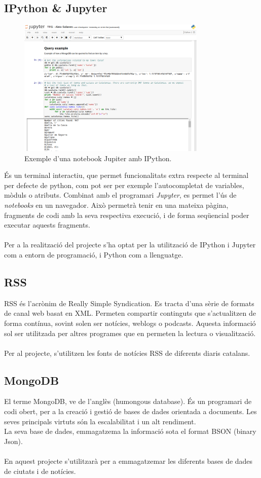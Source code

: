 \documentclass[12pt,a4paper,openright,oneside]{article}
\numberwithin{equation}{section}
\theoremstyle{definition}
\begin{document}
\subsection*{IPython \& Jupyter}
\begin{figure}[htbp]
\centering
\includegraphics[width=9cm]{ipython.png}
\caption{Exemple d'una notebook Jupiter amb IPython.}
\end{figure}
És un terminal interactiu, que permet funcionalitats extra respecte al terminal per defecte de python, com pot ser per exemple l'autocompletat de variables, mòduls o atributs. Combinat amb el programari \emph{Jupyter}, es permet l'ús de \emph{notebooks} en un navegador. Això permetrà tenir en una mateixa pàgina, fragments de codi amb la seva respectiva execució, i de forma seqüencial poder executar aquests fragments.\\\\
Per a la realització del projecte s'ha optat per la utilització de IPython i Jupyter com a entorn de programació, i Python com a llenguatge.\cite{ipython}
\subsection*{RSS}
RSS és l'acrònim de Really Simple Syndication. Es tracta d'una sèrie de formats de canal web basat en XML. Permeten compartir continguts que s'actualitzen de forma contínua, sovint solen ser notícies, weblogs o podcasts. Aquesta informació sol ser utilitzada per altres programes que en permeten la lectura o visualització.\\\\
Per al projecte, s'utilitzen les fonts de notícies RSS de diferents diaris catalans.\cite{rss}
\subsection*{MongoDB}
El terme MongoDB, ve de l'anglès (humongous database). És un programari de codi obert, per a la creació i gestió de bases de dades orientada a documents. Les seves principals virtuts són la escalabilitat i un alt rendiment.\\
La seva base de dades, emmagatzema la informació sota el format BSON (binary Json).\\\\
En aquest projecte s'utilitzarà per a emmagatzemar les diferents bases de dades de ciutats i de notícies.\cite{mongodb}
\end{document}
